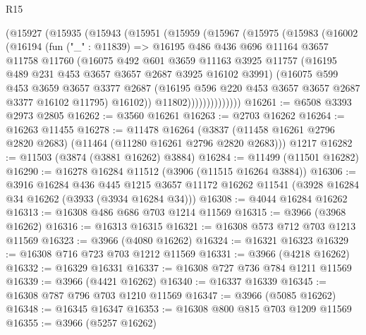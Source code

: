 \begin{lexlean}{R15}
\begin{coremodule}
          (@15927
            (@15935
              (@15943
                (@15951
                  (@15959
                    (@15967
                      (@15975
                        (@15983
                          (@16002
                            (@16194
                              (fun ("_" : @11839) =>
                              @16195
                                @486
                                @436
                                @696
                                @11164
                                @3657
                                @11758
                                @11760
                                (@16075
                                  @492
                                  @601
                                  @3659
                                  @11163
                                  @3925
                                  @11757
                                  (@16195 @489 @231 @453 @3657 @3657 @2687 @3925 @16102 @3991)
                                  (@16075
                                    @599
                                    @453
                                    @3659
                                    @3657
                                    @3377
                                    @2687
                                    (@16195 @596 @220 @453 @3657 @3657 @2687 @3377 @16102 @11795)
                                    @16102))
                                @11802))))))))))))))
@16261 := @6508 @3393 @2973 @2805
@16262 := @3560 @16261
@16263 := @2703 @16262
@16264 := @16263 @11455
@16278 := @11478
    @16264
    (@3837 (@11458 @16261 @2796 @2820 @2683) (@11464 (@11280 @16261 @2796 @2820 @2683)))
    @1217
@16282 := @11503 (@3874 (@3881 @16262) @3884)
@16284 := @11499 (@11501 @16282)
@16290 := @16278 @16284 @11512 (@3906 (@11515 @16264 @3884))
@16306 := @3916
    @16284
    @436
    @445
    @1215
    @3657
    @11172
    @16262
    @11541
    (@3928 @16284 @34 @16262 (@3933 (@3934 @16284 @34)))
@16308 := @4044 @16284 @16262
@16313 := @16308 @486 @686 @703 @1214 @11569
@16315 := @3966 (@3968 @16262)
@16316 := @16313 @16315
@16321 := @16308 @573 @712 @703 @1213 @11569
@16323 := @3966 (@4080 @16262)
@16324 := @16321 @16323
@16329 := @16308 @716 @723 @703 @1212 @11569
@16331 := @3966 (@4218 @16262)
@16332 := @16329 @16331
@16337 := @16308 @727 @736 @784 @1211 @11569
@16339 := @3966 (@4421 @16262)
@16340 := @16337 @16339
@16345 := @16308 @787 @796 @703 @1210 @11569
@16347 := @3966 (@5085 @16262)
@16348 := @16345 @16347
@16353 := @16308 @800 @815 @703 @1209 @11569
@16355 := @3966 (@5257 @16262)

\end{coremodule}
\end{lexlean}
